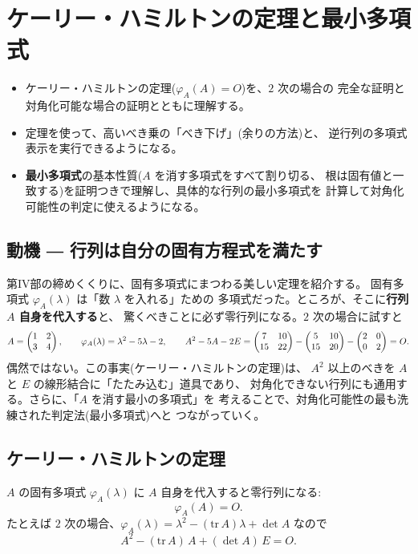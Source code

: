 \chapter{ケーリー・ハミルトンの定理と最小多項式}\label{chap:ch}

\begin{goal}
\begin{itemize}
\item ケーリー・ハミルトンの定理($\varphi_A(A) = O$)を、$2$ 次の場合の
完全な証明と対角化可能な場合の証明とともに理解する。
\item 定理を使って、高いべき乗の「べき下げ」(余りの方法)と、
逆行列の多項式表示を実行できるようになる。
\item \textbf{最小多項式}の基本性質($A$ を消す多項式をすべて割り切る、
根は固有値と一致する)を証明つきで理解し、具体的な行列の最小多項式を
計算して対角化可能性の判定に使えるようになる。
\end{itemize}
\end{goal}

\section{動機 ― 行列は自分の固有方程式を満たす}

第IV部の締めくくりに、固有多項式にまつわる美しい定理を紹介する。
固有多項式 $\varphi_A(\lambda)$ は「数 $\lambda$ を入れる」ための
多項式だった。ところが、そこに\textbf{行列 $A$ 自身を代入する}と、
驚くべきことに必ず零行列になる。$2$ 次の場合に試すと
\[
A = \begin{pmatrix}1 & 2 \\ 3 & 4\end{pmatrix}, \qquad
\varphi_A(\lambda) = \lambda^2 - 5\lambda - 2, \qquad
A^2 - 5A - 2E = \begin{pmatrix}7 & 10 \\ 15 & 22\end{pmatrix} - \begin{pmatrix}5 & 10 \\ 15 & 20\end{pmatrix}
- \begin{pmatrix}2 & 0 \\ 0 & 2\end{pmatrix} = O.
\]
偶然ではない。この事実(ケーリー・ハミルトンの定理)は、
$A^2$ 以上のべきを $A$ と $E$ の線形結合に「たたみ込む」道具であり、
対角化できない行列にも通用する。さらに、「$A$ を消す最小の多項式」を
考えることで、対角化可能性の最も洗練された判定法(最小多項式)へと
つながっていく。

\section{ケーリー・ハミルトンの定理}

\begin{teiri}\label{thm:ch-main}
$A$ の固有多項式 $\varphi_A(\lambda)$ に $A$ 自身を代入すると零行列になる:
\[
\varphi_A(A) = O.
\]
たとえば $2$ 次の場合、$\varphi_A(\lambda) = \lambda^2 - (\mathrm{tr}\,A)\lambda + \det A$ なので
\[
A^2 - (\mathrm{tr}\,A)\,A + (\det A)\,E = O.
\]
\end{teiri}

